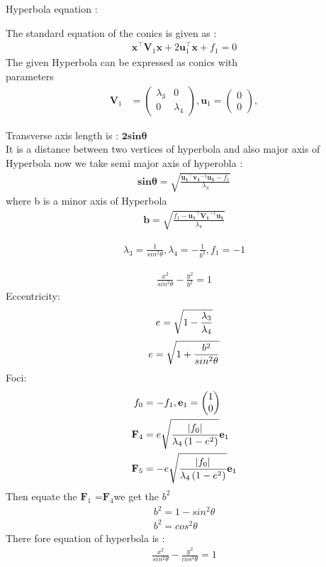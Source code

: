 \documentclass[10pt, a4paper]{article}
\providecommand{\brak}[1]{\ensuremath{\left(#1\right)}}
\newcommand{\myvec}[1]{\ensuremath{\begin{pmatrix}#1\end{pmatrix}}}
\let\vec\mathbf
\begin{document}
Hyperbola  equation : 

The standard equation of the conics is given as :
\begin{align}
\vec{x}^{\top}\vec{V}_1\vec{x}+2\vec{u}^{\top}_1\vec{x}+f_1=0
\end{align}
	 The given Hyperbola can be expressed as conics with \\parameters
\begin{align}
 \vec{V}_1 &= \myvec{	\lambda_3& 0 \\
			          0 & \lambda_4}  
		    , \vec{u}_1 = \myvec{0 \\0},
	\end{align}
 
 Transverse axis length is : $\vec{2sin\theta}$\\
 It is a distance between two vertices of hyperbola and also major axis of Hyperbola
now we take semi major axis of hyperobla :\\
\begin{align}
\vec{sin\theta}=\sqrt{\frac{\vec{u_1}^{\top}\vec{v_1}^{-1}\vec{u_1}-f_1}{\lambda_3}}
\end{align}
where b is a minor axis of Hyperbola 
\begin{align}
\vec{b}=\sqrt{\frac{f_1-\vec{u_1}^{\top}\vec{V_1}^{-1}\vec{u_1} }{\lambda_4}}
\end{align}

	\begin{align}
	\lambda_3=\frac{1}{sin^2\theta} , \lambda_4 = -\frac{1}{b^2}, f_1 = -1
	\end{align}

\begin{align}
\frac{x^2}{sin^2\theta}-\frac{y^2}{b^2}=1
  \end{align}
	Eccentricity:
	\begin{equation}
	 e =\sqrt{1-\frac{\lambda_3}{\lambda_4}}\\
	 \end{equation}
	 \begin{equation}
	 e =\sqrt{1+\frac{b^2}{sin^2\theta}}\\
	 \end{equation}
	 Foci:
	 \begin{align}
	 f_0&=-f_1,\vec{e}_1 = \myvec{1 \\0}\\
	 	 \vec{F}_4&=  e\sqrt{\frac{\abs{f_0}}{\lambda_4\brak{1-e^2}}}\vec{e}_1\\
	 	 \vec{F}_5&= - e\sqrt{\frac{\abs{f_0}}{\lambda_4\brak{1-e^2}}}\vec{e}_1	 	 
	 \end{align}
Then equate the $\vec{F}_1$ =$\vec{F}_4$we get the $b^2$ \\
\begin{align}
	b^2 = 1-sin^2\theta\\
	b^2 = cos^2\theta
	\end{align}
There fore equation of hyperbola is :
\begin{align}
\frac{x^2}{sin^2\theta}-\frac{y^2}{cos^2\theta}=1
\end{align}
\end{document}
